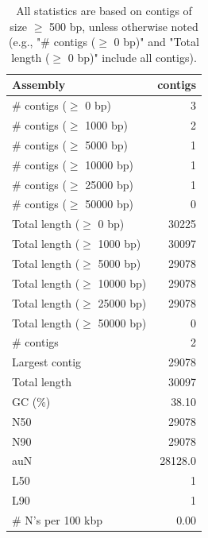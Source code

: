 \documentclass[12pt,a4paper]{article}
\begin{document}
\begin{table}[ht]
\begin{center}
\caption{All statistics are based on contigs of size $\geq$ 500 bp, unless otherwise noted (e.g., "\# contigs ($\geq$ 0 bp)" and "Total length ($\geq$ 0 bp)" include all contigs).}
\begin{tabular}{|l*{1}{|r}|}
\hline
Assembly & contigs \\ \hline
\# contigs ($\geq$ 0 bp) & 3 \\ \hline
\# contigs ($\geq$ 1000 bp) & 2 \\ \hline
\# contigs ($\geq$ 5000 bp) & 1 \\ \hline
\# contigs ($\geq$ 10000 bp) & 1 \\ \hline
\# contigs ($\geq$ 25000 bp) & 1 \\ \hline
\# contigs ($\geq$ 50000 bp) & 0 \\ \hline
Total length ($\geq$ 0 bp) & 30225 \\ \hline
Total length ($\geq$ 1000 bp) & 30097 \\ \hline
Total length ($\geq$ 5000 bp) & 29078 \\ \hline
Total length ($\geq$ 10000 bp) & 29078 \\ \hline
Total length ($\geq$ 25000 bp) & 29078 \\ \hline
Total length ($\geq$ 50000 bp) & 0 \\ \hline
\# contigs & 2 \\ \hline
Largest contig & 29078 \\ \hline
Total length & 30097 \\ \hline
GC (\%) & 38.10 \\ \hline
N50 & 29078 \\ \hline
N90 & 29078 \\ \hline
auN & 28128.0 \\ \hline
L50 & 1 \\ \hline
L90 & 1 \\ \hline
\# N's per 100 kbp & 0.00 \\ \hline
\end{tabular}
\end{center}
\end{table}
\end{document}
